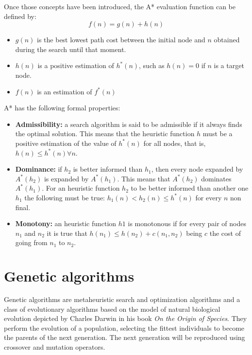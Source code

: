 \documentclass[11pt]{llncs}
\begin{document}
Once those concepts have been introduced, the A* evaluation function can be defined by:
\[f(n) = g(n) + h(n)\]
\begin{itemize}
    \item $g(n)$ is the best lowest path cost between the initial node and $n$ obtained during the search until that moment.
    \item $h(n)$ is a positive estimation of $h^{*}(n)$, such as $h(n) = 0$ if $n$ is a target node.
    \item $f(n)$ is an estimation of $f^{*}(n)$
\end{itemize}

A* has the following formal properties:
\begin{itemize}
    \item \textbf{Admissibility:} a search algorithm is said to be admissible if it always finds the optimal solution. This means that the heuristic function $h$ must be a positive estimation of the value of $h^{*}(n)$ for all nodes, that is, $h(n) \leq h^{*}(n) \forall n$. 
    \item \textbf{Dominance:} if $h_2$ is better informed than $h_1$, then every node expanded by $A^{*}(h_2)$ is expanded by $A^{*}(h_1)$. This means that $A^{*}(h_2)$ dominates $A^{*}(h_1)$. For an heuristic function $h_2$ to be better informed than another one $h_1$ the following must be true: $h_1(n) < h_2(n) \leq h^{*}(n)$ for every $n$ non final.
    \item \textbf{Monotony:} an heuristic function $h1$ is monotonous if for every pair of nodes $n_1$ and $n_2$ it is true that $h(n_1) \leq h(n_2) + c(n_1, n_2)$ being $c$ the cost of going from $n_1$ to $n_2$.
\end{itemize}
\section{Genetic algorithms}\label{gen_algs}
Genetic algorithms are metaheuristic search and optimization algorithms and a class of evolutionary algorithms based on the model of natural biological evolution depicted by Charles Darwin in his book \textit{On the Origin of Species}. They perform the evolution of a population, selecting the fittest individuals to become the parents of the next generation. The next generation will be reproduced using crossover and mutation operators.
\end{document}
